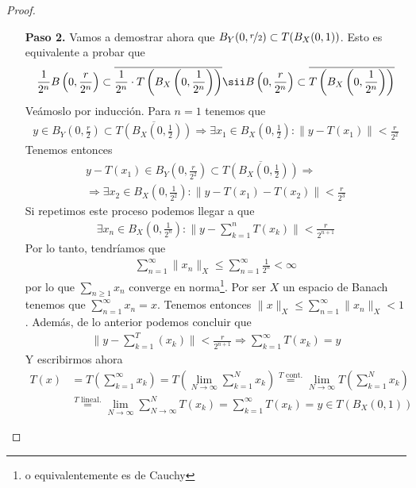 \begin{teo}
\begin{proof}
\begin{itemize}
            \item[\textbf{Paso 2.}] Vamos a demostrar ahora que $B_Y(0,\nicefrac{r}{2})\subset T(B_X(0,1))$. Esto es equivalente a probar que 
            \begin{gather*}
                \frac{1}{2^n} B\left(0, \frac{r}{2^n}\right) \subset \overline{\frac{1}{2^n} \cdot T\left(B_X\left(0,\frac{1}{2^n}\right)\right)} \sii B\left(0, \frac{r}{2^n}\right) \subset \overline{T\left(B_X\left(0,\frac{1}{2^n}\right)\right)}
            \end{gather*}
            Veámoslo por inducción. Para $n=1$ tenemos que
            \begin{gather*}
                y\in B_Y\left(0,\frac{r}{2}\right) \subset \overline{T\left(B_X\left(0,\frac{1}{2}\right)\right)} \Rightarrow \exists x_1 \in B_X\left(0,\frac{1}{2}\right) : \|y-T(x_1)\| < \frac{r}{2^2}
            \end{gather*}
            Tenemos entonces 
            \begin{gather*}
                y-T(x_1) \in B_Y\left(0,\frac{r}{2^2}\right) \subset \overline{T\left(B_X\left(0,\frac{1}{2}\right)\right)} \Rightarrow\\
                \Rightarrow \exists x_2 \in B_X\left(0,\frac{1}{2^2}\right) : \|y-T(x_1) - T(x_2)\| < \frac{r}{2^3}
            \end{gather*}
            Si repetimos este proceso podemos llegar a que 
            \begin{gather*}
                \exists x_n \in B_X\left(0,\frac{1}{2^n}\right) : \|y-\sum_{k=1}^n T(x_k)\| < \frac{r}{2^{n+1}}
            \end{gather*}
            Por lo tanto, tendríamos que 
            \begin{gather*}
                \sum_{n=1}^\infty \|x_n\|_X \leq \sum_{n=1}^\infty \frac{1}{2^n} < \infty
            \end{gather*}
            por lo que $\sum\limits_{n\geq 1} x_n$ converge en norma\footnote{o equivalentemente es de Cauchy}. Por ser $X$ un espacio de Banach tenemos que $\sum\limits_{n=1}^\infty x_n = x$. Tenemos entonces $\|x\|_X \leq \sum\limits_{n=1}^\infty \|x_n\|_X < 1$. Además, de lo anterior podemos concluir que
            \begin{gather*}
                \|y-\sum_{k=1}^ T(x_k)\| < \frac{r}{2^{n+1}} \Rightarrow \sum_{k=1}^\infty T(x_k) = y
            \end{gather*}
            Y escribirmos ahora
            \begin{align*}
                T(x) &= T\left(\sum_{k=1}^\infty x_k\right) = T\left(\lim_{N\to \infty}\sum_{k=1}^N x_k\right) \overset{T \text{ cont.}}{=} \lim_{N\to \infty}T\left(\sum_{k=1}^N x_k\right) \\
                &\overset{T \text{ lineal.}}{=} \lim_{N\to \infty} \sum_{N\to \infty}^N T(x_k) = \sum_{k=1}^\infty T(x_k) = y\in T(B_X(0,1))
            \end{align*}
        \end{itemize}
    \end{proof}
\end{teo}

